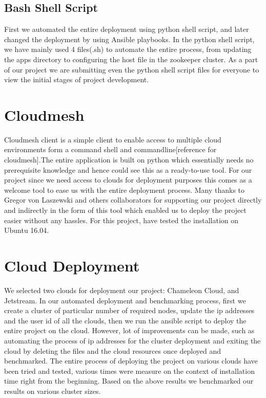 \documentclass[9pt,twocolumn,twoside]{../../styles/osajnl}
\begin{document}
\subsection{Bash Shell Script}

First we automated the entire deployment using python shell script,
and later changed the deployment by using Ansible playbooks. In the
python shell script, we have mainly used 4 files(.sh) to automate the
entire process, from updating the apps directory to configuring the
host file in the zookeeper cluster. As a part of our project we are
submitting even the python shell script files for everyone to view the
initial stages of project development.
  
\section{Cloudmesh}
Cloudmesh client is a simple client to enable access to multiple cloud
environments form a command shell and commandline[reference for
  cloudmesh].The entire application is built on python which
essentially needs no prerequisite knowledge and hence could see this
as a ready-to-use tool. For our project since we need access to clouds
for deployment purposes this comes as a welcome tool to ease us with
the entire deployment process. Many thanks to Gregor von Laszewski and
others collaborators for supporting our project directly and
indirectly in the form of this tool which enabled us to deploy the
project easier without any hassles. For this project, have tested the
installation on Ubuntu 16.04.

\section{Cloud Deployment}


We selected two clouds for deployment our project: Chameleon Cloud,
and Jetstream. In our automated deployment and benchmarking process,
first we create a cluster of particular number of required nodes,
update the ip addresses and the user id of all the clouds, then we run
the ansible script to deploy the entire project on the cloud. However,
lot of improvements can be made, such as automating the process of ip
addresses for the cluster deployment and exiting the cloud by deleting
the files and the cloud resources once deployed and benchmarked. The
entire process of deploying the project on various clouds have been
tried and tested, various times were measure on the context of
installation time right from the beginning. Based on the above results
we benchmarked our results on various cluster sizes.
\end{document}
